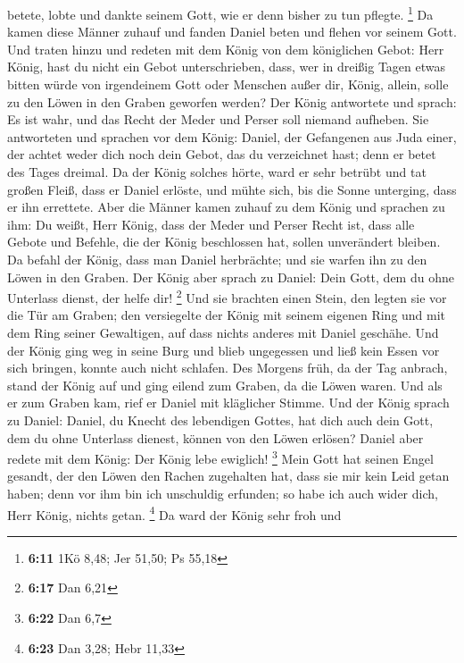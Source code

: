 betete, lobte und dankte seinem Gott, wie er denn bisher zu tun pflegte.
\footnote{\textbf{6:11} 1Kö 8,48; Jer 51,50; Ps 55,18} 
Da kamen diese Männer zuhauf und fanden Daniel beten und flehen vor
seinem Gott.  Und traten hinzu und redeten mit dem König
von dem königlichen Gebot: Herr König, hast du nicht ein Gebot
unterschrieben, dass, wer in dreißig Tagen etwas bitten würde von
irgendeinem Gott oder Menschen außer dir, König, allein, solle zu den
Löwen in den Graben geworfen werden? Der König antwortete und sprach: Es
ist wahr, und das Recht der Meder und Perser soll niemand aufheben.
 Sie antworteten und sprachen vor dem König: Daniel, der
Gefangenen aus Juda einer, der achtet weder dich noch dein Gebot, das du
verzeichnet hast; denn er betet des Tages dreimal.  Da
der König solches hörte, ward er sehr betrübt und tat großen Fleiß, dass
er Daniel erlöste, und mühte sich, bis die Sonne unterging, dass er ihn
errettete.  Aber die Männer kamen zuhauf zu dem König und
sprachen zu ihm: Du weißt, Herr König, dass der Meder und Perser Recht
ist, dass alle Gebote und Befehle, die der König beschlossen hat, sollen
unverändert bleiben.  Da befahl der König, dass man
Daniel herbrächte; und sie warfen ihn zu den Löwen in den Graben. Der
König aber sprach zu Daniel: Dein Gott, dem du ohne Unterlass dienst,
der helfe dir! \footnote{\textbf{6:17} Dan 6,21}  Und sie
brachten einen Stein, den legten sie vor die Tür am Graben; den
versiegelte der König mit seinem eigenen Ring und mit dem Ring seiner
Gewaltigen, auf dass nichts anderes mit Daniel geschähe. 
Und der König ging weg in seine Burg und blieb ungegessen und ließ kein
Essen vor sich bringen, konnte auch nicht schlafen.  Des
Morgens früh, da der Tag anbrach, stand der König auf und ging eilend
zum Graben, da die Löwen waren.  Und als er zum Graben
kam, rief er Daniel mit kläglicher Stimme. Und der König sprach zu
Daniel: Daniel, du Knecht des lebendigen Gottes, hat dich auch dein
Gott, dem du ohne Unterlass dienest, können von den Löwen erlösen?
 Daniel aber redete mit dem König: Der König lebe
ewiglich! \footnote{\textbf{6:22} Dan 6,7}  Mein Gott hat
seinen Engel gesandt, der den Löwen den Rachen zugehalten hat, dass sie
mir kein Leid getan haben; denn vor ihm bin ich unschuldig erfunden; so
habe ich auch wider dich, Herr König, nichts getan. \footnote{\textbf{6:23}
  Dan 3,28; Hebr 11,33}  Da ward der König sehr froh und
